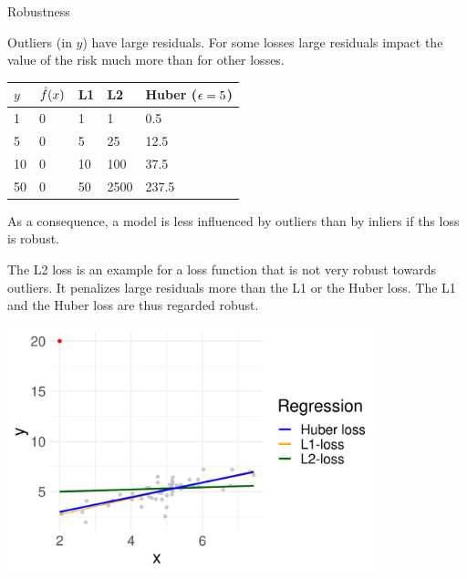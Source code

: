 \begin{vbframe}{Robustness}

Outliers (in $y$) have large residuals. For some losses large residuals impact the value of the risk much more than for other losses. 

\begin{table}[]
\begin{tabular}{lllll}
\toprule
$y$  & $\hat{f}(x)$ & L1 & L2 & Huber ($\epsilon = 5$) \\ \midrule 
1 & 0 & 1 & 1 & 0.5 \\ 
5 & 0 & 5 & 25 & 12.5 \\ 
10 & 0 & 10 & 100 & 37.5 \\ 
50 & 0 & 50 & 2500  & 237.5 \\ \bottomrule
\end{tabular}
\end{table}

As a consequence, a model is less influenced by outliers than by inliers if ths loss is robust. 

\framebreak 

The L2 loss is an example for a loss function that is not very robust towards outliers. It penalizes large residuals more than the L1 or the Huber loss. The L1 and the Huber loss are thus regarded robust. 

\begin{center}
\includegraphics[width=0.8\textwidth]{figure/robustness.png}
\end{center}

\end{vbframe}

